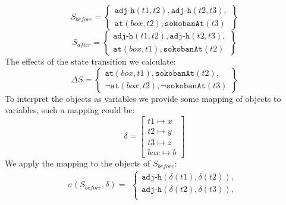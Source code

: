 \documentclass[../Master.tex]{subfiles}
\begin{document}
\begin{example}
    \begin{equation*}\label{eq:s_before}
    S_{before} =
        \left\{
            \begin{gathered}
                \texttt{adj-h}(t1, t2), \texttt{adj-h}(t2, t3), \\
                \texttt{at}(box,t2), \texttt{sokobanAt}(t3)
            \end{gathered}
        \right\}
    \end{equation*}
    \begin{equation*}
    S_{after} =
        \left\{
            \begin{gathered}
                \texttt{adj-h}(t1, t2), \texttt{adj-h}(t2, t3), \\
                \texttt{at}(box,t1), \texttt{sokobanAt}(t2)
            \end{gathered}
        \right\}
    \end{equation*}
    The effects of the state transition we calculate:
    \begin{equation*}
    \Delta S =
        \left\{
            \begin{gathered}
                \texttt{at}(box, t1), \texttt{sokobanAt}(t2), \\
                \neg\texttt{at}(box,t2), \neg\texttt{sokobanAt}(t3)
            \end{gathered}
        \right\}
    \end{equation*}
    To interpret the objects as variables we provide some mapping of objects to variables, such a mapping could be:
    \begin{equation*}
    \delta =
        \left [
            \begin{gathered}
                t1 \mapsto x \\
                t2 \mapsto y \\
                t3 \mapsto z \\
                box \mapsto b
            \end{gathered}
        \right ]
    \end{equation*}
    We apply the mapping to the objects of $S_{before}$:
    \begin{equation*}
        \sigma(S_{before}, \delta) =
        \begin{gathered}
            \left\{
                \begin{gathered}
                    \texttt{adj-h}(\delta (t1), \delta (t2)), \\
                    \texttt{adj-h}(\delta (t2), \delta (t3)), \\

\end{gathered}
\end{gathered}
\end{equation*}
\end{example}
\end{document}
